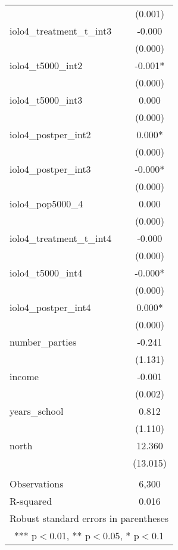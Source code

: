 \documentclass[]{article}
\begin{document}
\begin{tabular}{lc}
 & (0.001) \\
iolo4\_treatment\_t\_int3 & -0.000 \\
 & (0.000) \\
iolo4\_t5000\_int2 & -0.001* \\
 & (0.000) \\
iolo4\_t5000\_int3 & 0.000 \\
 & (0.000) \\
iolo4\_postper\_int2 & 0.000* \\
 & (0.000) \\
iolo4\_postper\_int3 & -0.000* \\
 & (0.000) \\
iolo4\_pop5000\_4 & 0.000 \\
 & (0.000) \\
iolo4\_treatment\_t\_int4 & -0.000 \\
 & (0.000) \\
iolo4\_t5000\_int4 & -0.000* \\
 & (0.000) \\
iolo4\_postper\_int4 & 0.000* \\
 & (0.000) \\
number\_parties & -0.241 \\
 & (1.131) \\
income & -0.001 \\
 & (0.002) \\
years\_school & 0.812 \\
 & (1.110) \\
north & 12.360 \\
 & (13.015) \\
 &  \\
Observations & 6,300 \\
 R-squared & 0.016 \\ \hline
\multicolumn{2}{c}{ Robust standard errors in parentheses} \\
\multicolumn{2}{c}{ *** p$<$0.01, ** p$<$0.05, * p$<$0.1} \\
\end{tabular}
\end{document}
